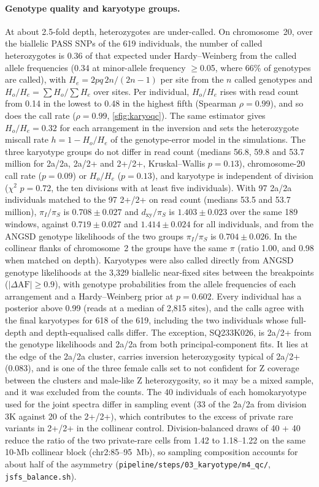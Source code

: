 \documentclass[11pt]{article}
\newcommand{\dxy}{d_\mathrm{xy}}
\begin{document}
\paragraph{Genotype quality and karyotype groups.}
At about 2.5-fold depth, heterozygotes are under-called. On chromosome~20, over the biallelic PASS SNPs of the 619 individuals, the number of called heterozygotes is 0.36 of that expected under Hardy--Weinberg from the called allele frequencies (0.34 at minor-allele frequency $\geq$0.05, where 66\% of genotypes are called), with $H_e=2pq\,2n/(2n-1)$ per site from the $n$ called genotypes and $H_o/H_e=\sum H_o/\sum H_e$ over sites. Per individual, $H_o/H_e$ rises with read count from 0.14 in the lowest to 0.48 in the highest fifth (Spearman $\rho=0.99$), and so does the call rate ($\rho=0.99$, \cref{sfig:karyoqc}). The same estimator gives $H_o/H_e=0.32$ for each arrangement in the inversion and sets the heterozygote miscall rate $h=1-H_o/H_e$ of the genotype-error model in the simulations. The three karyotype groups do not differ in read count (medians 56.8, 59.8 and 53.7 million for 2a/2a, 2a/2+ and 2+/2+, Kruskal--Wallis $p=0.13$), chromosome-20 call rate ($p=0.09$) or $H_o/H_e$ ($p=0.13$), and karyotype is independent of division ($\chi^2$ $p=0.72$, the ten divisions with at least five individuals). With 97 2a/2a individuals matched to the 97 2+/2+ on read count (medians 53.5 and 53.7 million), $\pi_I/\pi_S$ is $0.708\pm0.027$ and $\dxy/\pi_S$ is $1.403\pm0.023$ over the same 189 windows, against $0.719\pm0.027$ and $1.414\pm0.024$ for all individuals, and from the ANGSD genotype likelihoods of the two groups $\pi_I/\pi_S$ is $0.704\pm0.026$. In the collinear flanks of chromosome~2 the groups have the same $\pi$ (ratio 1.00, and 0.98 when matched on depth). Karyotypes were also called directly from ANGSD genotype likelihoods at the 3{,}329 biallelic near-fixed sites between the breakpoints ($|\Delta\mathrm{AF}|\geq0.9$), with genotype probabilities from the allele frequencies of each arrangement and a Hardy--Weinberg prior at $p=0.602$. Every individual has a posterior above 0.99 (reads at a median of 2{,}815 sites), and the calls agree with the final karyotypes for 618 of the 619, including the two individuals whose full-depth and depth-equalised calls differ. The exception, SQ233K026, is 2a/2+ from the genotype likelihoods and 2a/2a from both principal-component fits. It lies at the edge of the 2a/2a cluster, carries inversion heterozygosity typical of 2a/2+ (0.083), and is one of the three female calls set to not confident for Z coverage between the clusters and male-like Z heterozygosity, so it may be a mixed sample, and it was excluded from the counts. The 40 individuals of each homokaryotype used for the joint spectra differ in sampling event (33 of the 2a/2a from division 3K against 20 of the 2+/2+), which contributes to the excess of private rare variants in 2+/2+ in the collinear control. Division-balanced draws of 40 + 40 reduce the ratio of the two private-rare cells from 1.42 to 1.18--1.22 on the same 10-Mb collinear block (chr2:85--95~Mb), so sampling composition accounts for about half of the asymmetry (\texttt{pipeline/steps/03\_karyotype/m4\_qc/}, \texttt{jsfs\_balance.sh}).
\end{document}
